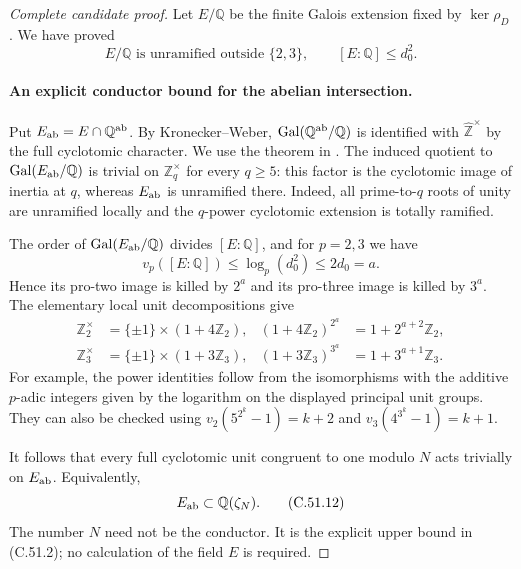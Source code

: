 \begin{proof}[Complete candidate proof]
Let $E/\mathbb Q$ be the finite Galois extension fixed by
$\ker\rho_D$. We have proved
\[
 E/\mathbb Q\text{ is unramified outside }\{2,3\},
 \qquad [E:\mathbb Q]\le d_0^2.
                                                        \tag{C.51.9}
\]

\paragraph{An explicit conductor bound for the abelian intersection.}
Put $E_{\rm ab}=E\cap\mathbb Q^{\rm ab}$.
By Kronecker--Weber,
$\operatorname{Gal}(\mathbb Q^{\rm ab}/\mathbb Q)$ is identified
with $\widehat{\mathbb Z}^{\times}$ by the full cyclotomic
character. We use the theorem in
\cite[I, Theorem~4.16, pp.~49--50]{PBC_MilneCFT}.
The induced quotient to $\operatorname{Gal}(E_{\rm ab}/\mathbb Q)$
is trivial on $\mathbb Z_q^\times$ for every $q\ge5$:
this factor is the cyclotomic image of inertia at $q$, whereas
$E_{\rm ab}$ is unramified there.
Indeed, all prime-to-$q$ roots of unity are unramified locally and
the $q$-power cyclotomic extension is totally ramified.

The order of $\operatorname{Gal}(E_{\rm ab}/\mathbb Q)$ divides
$[E:\mathbb Q]$, and for $p=2,3$ we have
\[
 v_p([E:\mathbb Q])\le \log_p(d_0^2)\le 2d_0=a.
                                                        \tag{C.51.10}
\]
Hence its pro-two image is killed by $2^a$ and its pro-three
image is killed by $3^a$.
The elementary local unit decompositions give
\[
 \begin{split}
  \mathbb Z_2^\times&=\{\pm1\}\times(1+4\mathbb Z_2),
       & (1+4\mathbb Z_2)^{2^a}&=1+2^{a+2}\mathbb Z_2,\\
  \mathbb Z_3^\times&=\{\pm1\}\times(1+3\mathbb Z_3),
       & (1+3\mathbb Z_3)^{3^a}&=1+3^{a+1}\mathbb Z_3.
 \end{split}                                             \tag{C.51.11}
\]
For example, the power identities follow from the isomorphisms
with the additive $p$-adic integers given by the logarithm on the
displayed principal unit groups. They can also be checked using
$v_2(5^{2^k}-1)=k+2$ and
$v_3(4^{3^k}-1)=k+1$.

It follows that every full cyclotomic unit congruent to one modulo
$N$ acts trivially on $E_{\rm ab}$. Equivalently,
\[
                         E_{\rm ab}\subset\mathbb Q(\zeta_N).
                                                        \tag{C.51.12}
\]
The number $N$ need not be the conductor. It is the explicit upper
bound in (C.51.2); no calculation of the field $E$ is required.


\end{proof}
